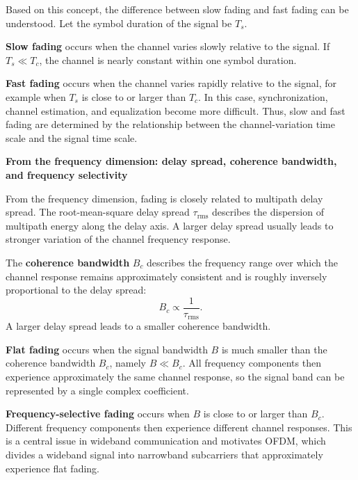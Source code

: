 Based on this concept,
the difference between slow fading and fast fading can be understood.
Let the symbol duration of the signal be \(T_s\).

\textbf{Slow fading} occurs when the channel varies slowly relative to the
signal.
If \(T_s \ll T_c\), the channel is nearly constant within one symbol duration.

\textbf{Fast fading} occurs when the channel varies rapidly relative to the
signal, for example when \(T_s\) is close to or larger than \(T_c\).
In this case, synchronization, channel estimation, and equalization become more
difficult.
Thus, slow and fast fading are determined by the relationship between the
channel-variation time scale and the signal time scale.

\noindent\textbullet\quad\textbf{From the frequency dimension: delay spread, coherence bandwidth, and frequency selectivity}

From the frequency dimension, fading is closely related to multipath delay
spread.
The root-mean-square delay spread \(\tau_{\mathrm{rms}}\) describes the
dispersion of multipath energy along the delay axis.
A larger delay spread usually leads to stronger variation of the channel
frequency response.

The \textbf{coherence bandwidth} \(B_c\) describes the frequency range over
which the channel response remains approximately consistent and is roughly
inversely proportional to the delay spread:
\begin{equation}
    B_c
    \propto
    \frac{1}{\tau_{\mathrm{rms}}}.
    \label{eq:coherence-bandwidth}
\end{equation}
A larger delay spread leads to a smaller coherence bandwidth.

\textbf{Flat fading} occurs when the signal bandwidth \(B\) is much smaller
than the coherence bandwidth \(B_c\), namely \(B \ll B_c\).
All frequency components then experience approximately the same channel
response, so the signal band can be represented by a single complex coefficient.

\textbf{Frequency-selective fading} occurs when \(B\) is close to or larger
than \(B_c\).
Different frequency components then experience different channel responses.
This is a central issue in wideband communication and motivates OFDM, which
divides a wideband signal into narrowband subcarriers that approximately
experience flat fading.

